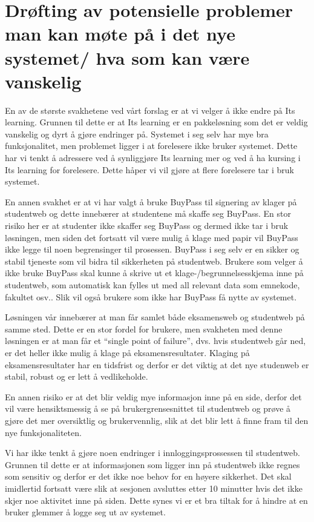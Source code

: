 
\section{Drøfting av potensielle problemer man kan møte på i det nye systemet/ hva som kan være vanskelig}


En av de største svakhetene ved vårt forslag er at vi velger å ikke endre på Its learning. Grunnen til dette er at Its learning er en pakkeløsning som det er veldig vanskelig og dyrt å gjøre endringer på. Systemet i seg selv har mye bra funksjonalitet, men problemet ligger i at forelesere ikke bruker systemet. Dette har vi tenkt å adressere ved å synliggjøre Its learning mer og ved å ha kursing i Its learning for forelesere. Dette håper vi vil gjøre at flere forelesere tar i bruk systemet.

En annen svakhet er at vi har valgt å bruke BuyPass til signering av klager på studentweb og dette innebærer at studentene må skaffe seg BuyPass. En stor risiko her er at studenter ikke skaffer seg BuyPass og dermed ikke tar i bruk løsningen, men siden det fortsatt vil være mulig å klage med papir vil BuyPass ikke legge til noen begrensinger til prosessen. BuyPass i seg selv er en sikker og stabil tjeneste som vil bidra til sikkerheten på studentweb. Brukere som velger å ikke bruke BuyPass skal kunne å skrive ut et klage-/begrunnelsesskjema inne på studentweb, som automatisk kan fylles ut med all relevant data som emnekode, fakultet osv.. Slik vil også brukere som ikke har BuyPass få nytte av systemet. 

Løsningen vår innebærer at man får samlet både eksamensweb og studentweb på samme sted. Dette er en stor fordel for brukere, men svakheten med denne løsningen er at man får et “single point of failure”, dvs. hvis studentweb går ned, er det heller ikke mulig å klage på eksamensresultater. Klaging på eksamensresultater har en tidsfrist og derfor er det viktig at det nye studenweb er stabil, robust og er lett å vedlikeholde.

En annen risiko er at det blir veldig mye informasjon inne på en side, derfor det vil være hensiktsmessig å se på brukergrensesnittet til studentweb og prøve å gjøre det mer oversiktlig og brukervennlig, slik at det blir lett å finne fram til den nye funksjonaliteten.
 	 	 	
Vi har ikke tenkt å gjøre noen endringer i innloggingsprossessen til studentweb. Grunnen til dette er at informasjonen som ligger inn på studentweb ikke regnes som sensitiv og derfor er det ikke noe behov for en høyere sikkerhet. Det skal imidlertid fortsatt være slik at sesjonen avsluttes etter 10 minutter hvis det ikke skjer noe aktivitet inne på siden. Dette synes vi er et bra tiltak for å hindre at en bruker glemmer å logge seg ut av systemet.

